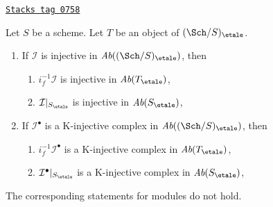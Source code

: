 \begin{lemma}
\label{etale-cohomology-lemma-compare-injectives}
\href{https://stacks.math.columbia.edu/tag/0758}{\texttt{Stacks tag 0758}}

Let $S$ be a scheme. Let $T$ be an object of $(\Sch/S)_\etale$.
\begin{enumerate}
\item If $\mathcal{I}$ is injective in $\textit{Ab}((\Sch/S)_\etale)$, then
\begin{enumerate}
\item $i_f^{-1}\mathcal{I}$ is injective in $\textit{Ab}(T_\etale)$,
\item $\mathcal{I}|_{S_\etale}$ is injective in $\textit{Ab}(S_\etale)$,
\end{enumerate}
\item If $\mathcal{I}^\bullet$ is a K-injective complex
in $\textit{Ab}((\Sch/S)_\etale)$, then
\begin{enumerate}
\item $i_f^{-1}\mathcal{I}^\bullet$ is a K-injective complex in
$\textit{Ab}(T_\etale)$,
\item $\mathcal{I}^\bullet|_{S_\etale}$ is a K-injective complex in
$\textit{Ab}(S_\etale)$,
\end{enumerate}
\end{enumerate}
The corresponding statements for modules do not hold.
\end{lemma}

